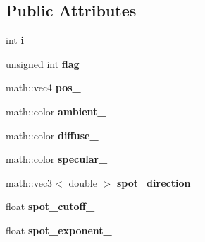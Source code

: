 \subsection*{\-Public \-Attributes}
\begin{DoxyCompactItemize}
\item 
\hypertarget{classglutpp_1_1light_1_1raw_a389bc9abc3833ee2b0ad9f586eb6b130}{int {\bfseries i\-\_\-}}\label{classglutpp_1_1light_1_1raw_a389bc9abc3833ee2b0ad9f586eb6b130}

\item 
\hypertarget{classglutpp_1_1light_1_1raw_a23186cbd578307e19e25de70506bf685}{unsigned int {\bfseries flag\-\_\-}}\label{classglutpp_1_1light_1_1raw_a23186cbd578307e19e25de70506bf685}

\item 
\hypertarget{classglutpp_1_1light_1_1raw_a1f54152c002ec54e48a0c2a8bd94adad}{math\-::vec4 {\bfseries pos\-\_\-}}\label{classglutpp_1_1light_1_1raw_a1f54152c002ec54e48a0c2a8bd94adad}

\item 
\hypertarget{classglutpp_1_1light_1_1raw_ac18c9d5ee5bee2910a9eba1595aff1f1}{math\-::color {\bfseries ambient\-\_\-}}\label{classglutpp_1_1light_1_1raw_ac18c9d5ee5bee2910a9eba1595aff1f1}

\item 
\hypertarget{classglutpp_1_1light_1_1raw_a65c6e8c5b03c3bf7b0194595cb3f1473}{math\-::color {\bfseries diffuse\-\_\-}}\label{classglutpp_1_1light_1_1raw_a65c6e8c5b03c3bf7b0194595cb3f1473}

\item 
\hypertarget{classglutpp_1_1light_1_1raw_a246e23455d3727d2da3f79599da63753}{math\-::color {\bfseries specular\-\_\-}}\label{classglutpp_1_1light_1_1raw_a246e23455d3727d2da3f79599da63753}

\item 
\hypertarget{classglutpp_1_1light_1_1raw_a662c16441e5d75558b67844791b2659f}{math\-::vec3$<$ double $>$ {\bfseries spot\-\_\-direction\-\_\-}}\label{classglutpp_1_1light_1_1raw_a662c16441e5d75558b67844791b2659f}

\item 
\hypertarget{classglutpp_1_1light_1_1raw_a64b2bf603905b262df5f4bba59656773}{float {\bfseries spot\-\_\-cutoff\-\_\-}}\label{classglutpp_1_1light_1_1raw_a64b2bf603905b262df5f4bba59656773}

\item 
\hypertarget{classglutpp_1_1light_1_1raw_adc838bbb511b1804b854f72238c98088}{float {\bfseries spot\-\_\-exponent\-\_\-}}\label{classglutpp_1_1light_1_1raw_adc838bbb511b1804b854f72238c98088}


\end{DoxyCompactItemize}

